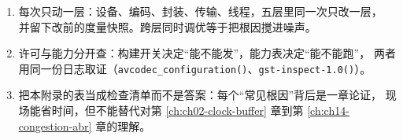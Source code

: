 \documentclass[12pt,a4paper,fontset=fandol]{ctexbook}
\newcommand{\Fn}[1]{\texttt{#1()}}
\newcommand{\Bk}{\discretionary{}{}{}}
\begin{document}
\begin{bestpractice}[title={选型与排障共享的三条纪律}]
\begin{enumerate}
\item 每次只动一层：设备、编码、封装、传输、线程，五层里同一次只改一层，
      并留下改前的度量快照。跨层同时调优等于把根因搅进噪声。
\item 许可与能力分开查：构建开关决定``能不能发''，能力表决定``能不能跑''，
      两者用同一份日志取证（\Fn{avcodec\_configuration}、\Fn{gst-inspect-\Bk 1.0}）。
\item 把本附录的表当成检查清单而不是答案：每个``常见根因''背后是一章论证，
      现场能省时间，但不能替代对第 \ref{ch:ch02-clock-buffer} 章到第
      \ref{ch:ch14-congestion-abr} 章的理解。
\end{enumerate}
\end{bestpractice}
\end{document}
